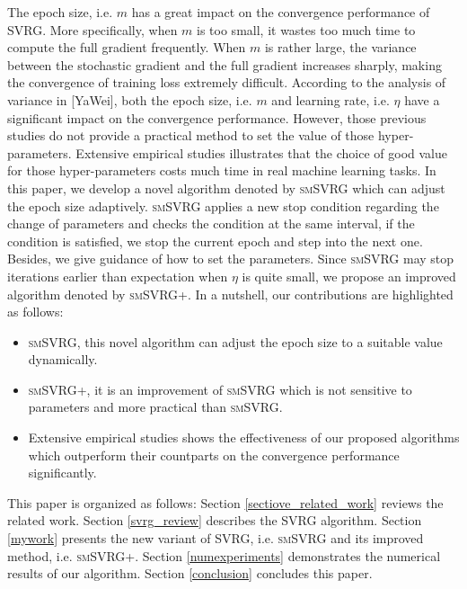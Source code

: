 \documentclass[conference]{IEEEtran}
\begin{document}
The epoch size, i.e. $m$ has a great impact on the convergence performance of SVRG. More specifically, when $m$ is too small, it wastes too much time to compute the full gradient frequently. When $m$ is rather large, the variance between the stochastic gradient and the full gradient increases sharply, making the convergence of training loss extremely difficult. According to the analysis of variance in [YaWei], both the epoch size, i.e. $m$ and learning rate, i.e. $\eta$ have a significant impact on the convergence performance.  However, those previous studies do not provide a practical method to set the value of those hyper-parameters. Extensive empirical studies illustrates that the choice of good value for those hyper-parameters costs much time in real machine learning tasks.  
In this paper, we develop a novel algorithm denoted by \textsc{smSVRG} which can adjust the epoch size adaptively.  
\textsc{smSVRG} applies a new stop condition regarding the change of parameters and checks the condition at the same interval, if the condition is satisfied, we stop the current epoch and step into the next one.
Besides, we give guidance of how to set the parameters. Since \textsc{smSVRG} may stop iterations earlier than expectation when $\eta$ is quite small, we propose an improved algorithm denoted by \textsc{smSVRG+}. In a nutshell, our contributions are highlighted as follows:
\begin {itemize}
\item \textsc{smSVRG}, this novel algorithm can adjust the epoch size to a suitable value dynamically.
\item \textsc{smSVRG+}, it is an improvement of \textsc{smSVRG} which is not sensitive to parameters and more practical than \textsc{smSVRG}.
\item Extensive empirical studies shows the effectiveness of our proposed algorithms which outperform their countparts on the convergence performance significantly.
\end {itemize}
This paper is organized as follows: Section \ref{sectiove_related_work} reviews the related work. Section \ref{svrg_review} describes the SVRG algorithm. Section \ref{mywork} presents the new variant of SVRG, i.e. \textsc{smSVRG} and its improved method, i.e. \textsc{smSVRG+}. Section \ref{numexperiments} demonstrates the numerical results of our algorithm. Section \ref{conclusion} concludes this paper.
\end{document}

